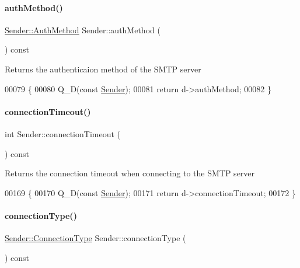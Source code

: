 \paragraph{\texorpdfstring{auth\+Method()}{authMethod()}}
{\footnotesize\ttfamily \hyperlink{class_simple_mail_1_1_sender_af50defb714bc3e95f47c71a9ba6ee6bb}{Sender\+::\+Auth\+Method} Sender\+::auth\+Method (\begin{DoxyParamCaption}{ }\end{DoxyParamCaption}) const}

Returns the authenticaion method of the S\+M\+TP server 
\begin{DoxyCode}
00079 \{
00080     Q\_D(\textcolor{keyword}{const} \hyperlink{class_simple_mail_1_1_sender}{Sender});
00081     \textcolor{keywordflow}{return} d->authMethod;
00082 \}
\end{DoxyCode}
\mbox{\label{class_simple_mail_1_1_sender_a7d849aadcddaf812c9d1c4411c134381}} 
\paragraph{\texorpdfstring{connection\+Timeout()}{connectionTimeout()}}
{\footnotesize\ttfamily int Sender\+::connection\+Timeout (\begin{DoxyParamCaption}{ }\end{DoxyParamCaption}) const}

Returns the connection timeout when connecting to the S\+M\+TP server 
\begin{DoxyCode}
00169 \{
00170     Q\_D(\textcolor{keyword}{const} \hyperlink{class_simple_mail_1_1_sender}{Sender});
00171     \textcolor{keywordflow}{return} d->connectionTimeout;
00172 \}
\end{DoxyCode}
\mbox{\label{class_simple_mail_1_1_sender_a044468efe3bafa577a3039b997a4ae23}} 
\paragraph{\texorpdfstring{connection\+Type()}{connectionType()}}
{\footnotesize\ttfamily \hyperlink{class_simple_mail_1_1_sender_a89e6a9572b306441237f6b6635729d1a}{Sender\+::\+Connection\+Type} Sender\+::connection\+Type (\begin{DoxyParamCaption}{ }\end{DoxyParamCaption}) const}


